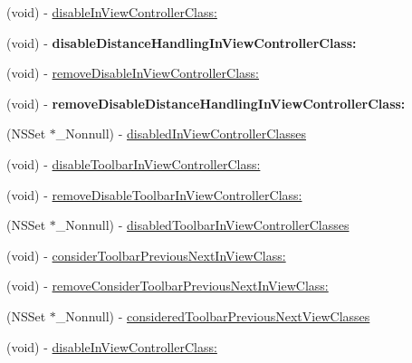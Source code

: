\begin{Indent}
\begin{DoxyCompactItemize}
\item 
(void) -\/ \mbox{\hyperlink{interface_i_q_keyboard_manager_a95cec0b3acf0d474e40883408b1c7785}{disable\+In\+View\+Controller\+Class\+:}}
\item 
\mbox{\label{interface_i_q_keyboard_manager_a9ceb61d3bd983a030f9c65cd1b8152c8}} 
(void) -\/ {\bfseries disable\+Distance\+Handling\+In\+View\+Controller\+Class\+:}
\item 
(void) -\/ \mbox{\hyperlink{interface_i_q_keyboard_manager_a816df2d7f4896490aba75e0e4172aca8}{remove\+Disable\+In\+View\+Controller\+Class\+:}}
\item 
\mbox{\label{interface_i_q_keyboard_manager_add246a2457d7aa32b4808f8682f66f8d}} 
(void) -\/ {\bfseries remove\+Disable\+Distance\+Handling\+In\+View\+Controller\+Class\+:}
\item 
(N\+S\+Set $\ast$\+\_\+\+Nonnull) -\/ \mbox{\hyperlink{interface_i_q_keyboard_manager_a3549c4c0b46b18854a0c3467276c0e3a}{disabled\+In\+View\+Controller\+Classes}}
\item 
(void) -\/ \mbox{\hyperlink{interface_i_q_keyboard_manager_ab613a813f64570cb4c10e03887356692}{disable\+Toolbar\+In\+View\+Controller\+Class\+:}}
\item 
(void) -\/ \mbox{\hyperlink{interface_i_q_keyboard_manager_a71d38785360ac94f27319b3bf9119d9e}{remove\+Disable\+Toolbar\+In\+View\+Controller\+Class\+:}}
\item 
(N\+S\+Set $\ast$\+\_\+\+Nonnull) -\/ \mbox{\hyperlink{interface_i_q_keyboard_manager_a4ddc098b0159752d9e935ceb97fe7f8c}{disabled\+Toolbar\+In\+View\+Controller\+Classes}}
\item 
(void) -\/ \mbox{\hyperlink{interface_i_q_keyboard_manager_a2d970d5680770d6aaced62a822b31958}{consider\+Toolbar\+Previous\+Next\+In\+View\+Class\+:}}
\item 
(void) -\/ \mbox{\hyperlink{interface_i_q_keyboard_manager_acd8d803c2aaaeab1204c709d81875a26}{remove\+Consider\+Toolbar\+Previous\+Next\+In\+View\+Class\+:}}
\item 
(N\+S\+Set $\ast$\+\_\+\+Nonnull) -\/ \mbox{\hyperlink{interface_i_q_keyboard_manager_a53372abfa157904c7e17dd8b5b544b09}{considered\+Toolbar\+Previous\+Next\+View\+Classes}}
\item 
(void) -\/ \mbox{\hyperlink{interface_i_q_keyboard_manager_a95cec0b3acf0d474e40883408b1c7785}{disable\+In\+View\+Controller\+Class\+:}}
\item 

\end{DoxyCompactItemize}
\end{Indent}
